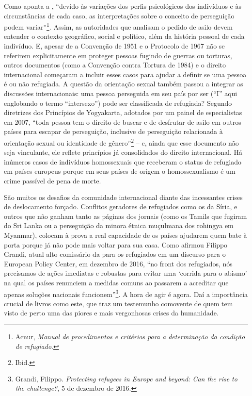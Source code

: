 Como aponta a , ``devido às variações dos perfis psicológicos dos
indivíduos e às circunstâncias de cada caso, as interpretações sobre o
conceito de perseguição podem variar''\footnote{Acnur,
  \emph{Manual de procedimentos e critérios para a determinação da
  condição de refugiado}.}. Assim, as autoridades que
analisam o pedido de asilo devem entender o contexto geográfico, social
e político, além da história pessoal de cada indivíduo. E, apesar de a
Convenção de 1951 e o Protocolo de 1967 não se referirem explicitamente
em proteger pessoas fugindo de guerras ou torturas, outros documentos
(como a Convenção contra Tortura de 1984) e o direito internacional
começaram a incluir esses casos para ajudar a definir se uma pessoa é ou
não refugiada. A questão da orientação sexual também passou a integrar
as discussões internacionais: uma pessoa perseguida em seu país por ser
 (``I'' aqui englobando o termo ``intersexo'') pode ser
classificada de refugiada? Segundo diretrizes dos Princípios de
Yogyakarta, adotados por um painel de especialistas em 2007, ``toda
pessoa tem o direito de buscar e de desfrutar de asilo em outros países
para escapar de perseguição, inclusive de perseguição relacionada à
orientação sexual ou identidade de gênero''\footnote{Ibid.}  
-- e, ainda que esse
documento não seja vinculante, ele reflete princípios já consolidados do
direito internacional. Há inúmeros casos de indivíduos homossexuais que
receberam o status de refugiado em países europeus porque em seus países
de origem o homossexualismo é um crime passível de pena de morte.

São muitos os desafios da comunidade internacional diante das
incessantes crises de deslocamento forçado. Conflitos geradores de
refugiados como os da Síria, e outros que não ganham tanto as páginas
dos jornais (como os Tamils que fugiram do Sri Lanka ou a perseguição da
minora étnica muçulmana dos rohingya em Myanmar), colocam à prova a real
capacidade de os países ajudarem quem bate à porta porque já não pode
mais voltar para sua casa. Como afirmou Filippo Grandi, atual alto
comissário da  para os refugiados em um discurso para o European
Policy Center, em dezembro de 2016, ``no front dos refugiados, nós
precisamos de ações imediatas e robustas para evitar uma `corrida para o
abismo' na qual os países renunciem a medidas comuns ao passarem a
acreditar que apenas soluções nacionais funcionem''\footnote{Grandi,
  Filippo. \emph{Protecting refugees in Europe and beyond: Can the 
  rise to the challenge?}, 5 de dezembro de 2016.}. A hora de agir
é agora. Daí a importância crucial de livros como este, que traz um
testemunho comovente de quem tem visto de perto uma das piores e mais
vergonhosas crises da humanidade.

